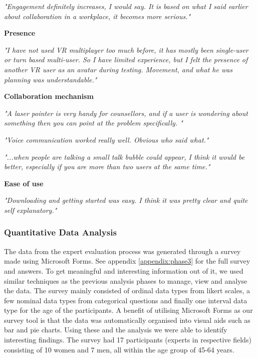 \begin{displayquote}
\textit{"Engagement definitely increases, I would say. It is based on what I said earlier about collaboration in a workplace, it becomes more serious."}
\end{displayquote}


\newpage
\noindent\textbf{Presence}
\begin{displayquote}
\textit{"I have not used VR multiplayer too much before, it has mostly been single-user or turn based multi-user. So I have limited experience, but I felt the presence of another VR user as an avatar during testing.  Movement, and what he was planning was understandable."}
\end{displayquote}

\vspace{0.2cm}
\noindent\textbf{Collaboration mechanism}
\begin{displayquote}
\textit{"A laser pointer is very handy for counsellors, and if a user is wondering about something then you can point at the problem specifically. "}
\end{displayquote}

\begin{displayquote}
\textit{"Voice communication worked really well. Obvious who said what."}
\end{displayquote}

\begin{displayquote}
\textit{"...when people are talking a small talk bubble could appear, I think it would be better, especially if you are more than two users at the same time."}
\end{displayquote}


\vspace{0.2cm}
\noindent\textbf{Ease of use}
\begin{displayquote}
\textit{"Downloading and getting started was easy. I think it was pretty clear and quite self explanatory."}
\end{displayquote}




\subsubsection{Quantitative Data Analysis}
The data from the expert evaluation process was generated through a survey made using Microsoft Forms. See appendix \ref{appendix:phase3} for the full survey and answers. To get meaningful and interesting information out of it, we used similar techniques as the previous analysis phases to manage, view and analyse the data. The survey mainly consisted of ordinal data types from likert scales, a few nominal data types from categorical questions and finally one interval data type for the age of the participants.  
A benefit of utilising Microsoft Forms as our survey tool is that the data was automatically organised into visual aids such as bar and pie charts. Using these and the analysis we were able to identify interesting findings. 
The survey had 17 participants (experts in respective fields) consisting of 10 women and 7 men, all within the age group  of 45-64 years. 


